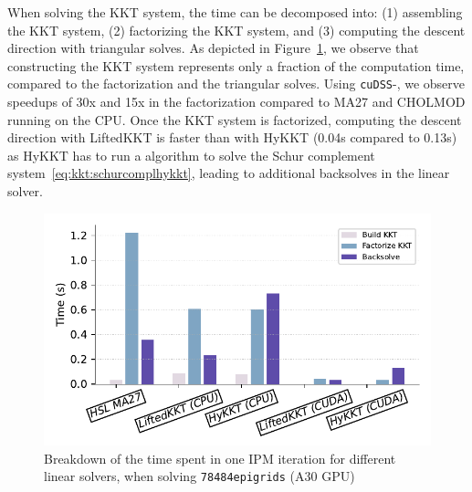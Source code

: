 When solving the KKT system, the time can be decomposed into: (1) assembling the
KKT system, (2) factorizing the KKT system, and (3) computing the descent direction with triangular solves.
As depicted in Figure~\ref{fig:timebreakdown}, we observe
that constructing the KKT system represents only a fraction of the computation time, compared
to the factorization and the triangular solves. Using {\tt cuDSS}-\ldlt, we observe speedups of
30x and 15x in the factorization compared to MA27 and CHOLMOD running on the CPU.
Once the KKT system is factorized, computing the descent direction with LiftedKKT is faster than with HyKKT
(0.04s compared to 0.13s) as HyKKT has to run a \CG algorithm to solve the Schur complement
system~\eqref{eq:kkt:schurcomplhykkt}, leading to additional backsolves
in the linear solver.

\begin{figure}[!ht]
  \centering
  \includegraphics[width=.7\textwidth]{../figures/breakdown.pdf}
  \caption{Breakdown of the time spent in one IPM iteration
    for different linear solvers, when solving {\tt 78484epigrids} (A30 GPU)
  \label{fig:timebreakdown}}
\end{figure}



